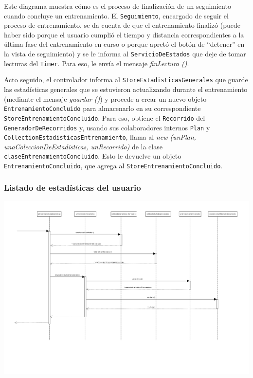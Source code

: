 Este diagrama muestra cómo es el proceso de finalización de un seguimiento cuando concluye un entrenamiento. El \texttt{Seguimiento}, encargado de seguir el proceso de entrenamiento, se da cuenta de que el entrenamiento finalizó (puede haber sido porque el usuario cumplió el tiempo y distancia correspondientes a la última fase del entrenamiento en curso o porque apretó el botón de ``detener'' en la vista de seguimiento) y se le informa al \texttt{ServicioDeEstados} que deje de tomar lecturas del \texttt{Timer}. Para eso, le envía el mensaje \emph{finLectura ()}. 

Acto seguido, el controlador informa al \texttt{StoreEstadisticasGenerales} que guarde las estadísticas generales que se estuvieron actualizando durante el entrenamiento (mediante el mensaje \emph{guardar ()}) y procede a crear un nuevo objeto \texttt{EntrenamientoConcluido} para almacenarlo en su correspondiente \texttt{StoreEntrenamientoConcluido}. Para eso, obtiene el \texttt{Recorrido} del \texttt{GeneradorDeRecorridos} y, usando sus colaboradores internos \texttt{Plan} y \texttt{CollectionEstadisticasEntrenamiento}, llama al \emph{new (unPlan, unaColeccionDeEstadisticas, unRecorrido)} de la clase \texttt{claseEntrenamientoConcluido}. Esto le devuelve un objeto \texttt{EntrenamientoConcluido}, que agrega al \texttt{StoreEntrenamientoConcluido}.

\subsubsection{Listado de estadísticas del usuario}
\begin{center}
        \includegraphics[scale=0.5]{images/ListadoEstadisticas.pdf}
\end{center}


